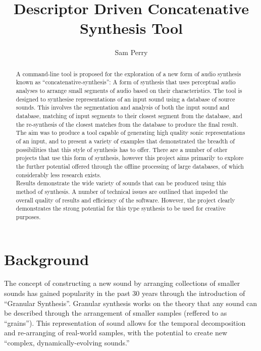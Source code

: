 \documentclass{scrartcl}
\begin{document}
    \title{Descriptor Driven Concatenative Synthesis Tool}
    \author{Sam Perry}

    \maketitle


    \begin{abstract} 
    A command-line tool is proposed for the exploration of a new form of audio
    synthesis known as ``concatenative-synthesis'': A form of synthesis that uses
    perceptual audio analyses to arrange small segments of audio based on their
    characteristics.  The tool is designed to synthesise representations of an
    input sound using a database of source sounds. This involves the
    segmentation and analysis of both the input sound and database, matching of
    input segments to their closest segment from the database, and the
    re-synthesis of the closest matches from the database to produce the final
    result.\\

    The aim was to produce a tool capable of generating high quality sonic
    representations of an input, and to present a variety of examples that
    demonstrated the breadth of possibilities that this style of synthesis has
    to offer. There are a number of other projects that use this form of
    synthesis, however this project aims primarily to explore the further
    potential offered through the offline processing of large databases, of
    which considerably less research exists.\\

    Results demonstrate the wide variety of sounds that can be produced using
    this method of synthesis. A number of technical issues are outlined that
    impeded the overall quality of results and efficiency of the software.
    However, the project clearly demonstrates the strong potential for this
    type synthesis to be used for creative purposes.
    \end{abstract}

    \section*{Background}
    The concept of constructing a new sound by arranging collections of smaller
    sounds has gained popularity in the past 30 years through the introduction
    of ``Granular Synthesis''. Granular synthesis works on the theory that any
    sound can be described through the arrangement of smaller samples (reffered
    to as ``grains''). This representation of sound allows for the temporal
    decomposition and re-arranging of real-world samples, with the potential to
    create new ``complex, dynamically-evolving
    sounds.''~\parencite[p.1]{itgs1988cr}\\
\end{document}
